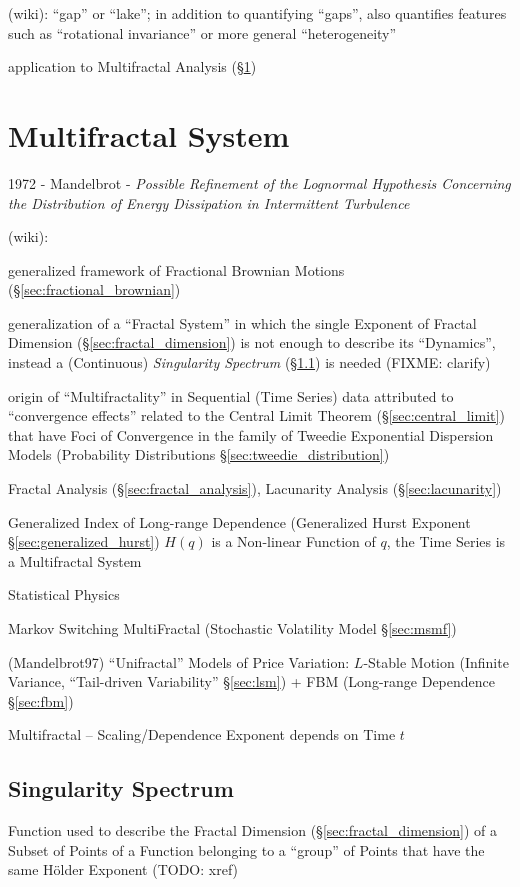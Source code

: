 (wiki): ``gap'' or ``lake''; in addition to quantifying ``gaps'', also
quantifies features such as ``rotational invariance'' or more general
``heterogeneity''

application to Multifractal Analysis (\S\ref{sec:multifractal_system})



\section{Multifractal System}\label{sec:multifractal_system}

1972 - Mandelbrot - \emph{Possible Refinement of the Lognormal Hypothesis
  Concerning the Distribution of Energy Dissipation in Intermittent Turbulence}

(wiki):

generalized framework of Fractional Brownian Motions
(\S\ref{sec:fractional_brownian})

generalization of a ``Fractal System'' in which the single Exponent of Fractal
Dimension (\S\ref{sec:fractal_dimension}) is not enough to describe its
``Dynamics'',  instead a (Continuous) \emph{Singularity Spectrum}
(\S\ref{sec:singularity_spectrum}) is needed (FIXME: clarify)

origin of ``Multifractality'' in Sequential (Time Series) data attributed to
``convergence effects'' related to the Central Limit Theorem
(\S\ref{sec:central_limit}) that have Foci of Convergence in the family of
Tweedie Exponential Dispersion Models (Probability Distributions
\S\ref{sec:tweedie_distribution})

Fractal Analysis (\S\ref{sec:fractal_analysis}), Lacunarity Analysis
(\S\ref{sec:lacunarity})

Generalized Index of Long-range Dependence (Generalized Hurst Exponent
\S\ref{sec:generalized_hurst}) $H(q)$ is a Non-linear Function of $q$, the Time
Series is a Multifractal System

Statistical Physics

\fist Markov Switching MultiFractal (Stochastic Volatility Model
\S\ref{sec:msmf})

(Mandelbrot97) ``Unifractal'' Models of Price Variation: $L$-Stable Motion
(Infinite Variance, ``Tail-driven Variability'' \S\ref{sec:lsm}) + FBM
(Long-range Dependence \S\ref{sec:fbm})

Multifractal -- Scaling/Dependence Exponent depends on Time $t$



\subsection{Singularity Spectrum}\label{sec:singularity_spectrum}

Function used to describe the Fractal Dimension (\S\ref{sec:fractal_dimension})
of a Subset of Points of a Function belonging to a ``group'' of Points that have
the same H\"older Exponent (TODO: xref)
